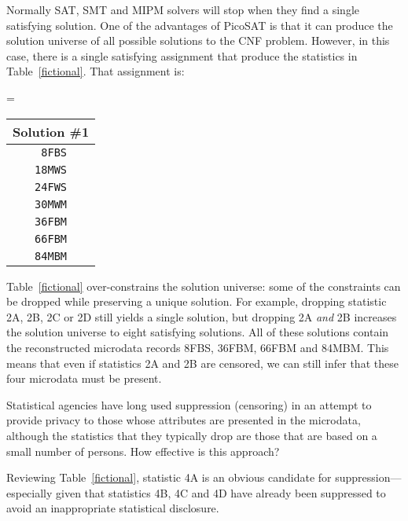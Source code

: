 \documentclass[runningheads]{llncs}
\begin{document}
Normally SAT, SMT and MIPM solvers will stop when they find a single
satisfying solution. One of the advantages of PicoSAT is that it can
produce the solution universe of all possible solutions to the CNF
problem. However, in this case, there is a single satisfying
assignment that produce the statistics in
Table~\ref{fictional}. That assignment is:

\begin{center}
\begin{minipage}{1.5in}
  
\end{minipage}
\begin{minipage}{.5in}
  =
\end{minipage}
\begin{minipage}{1.5in}
\begin{tabular}{c}
  Solution \#1\\
  \hline
\texttt{ 8FBS}\\
\texttt{18MWS}\\
\texttt{24FWS}\\
\texttt{30MWM}\\
\texttt{36FBM}\\
\texttt{66FBM}\\
\texttt{84MBM}\\
\end{tabular}
\end{minipage}
\end{center}  
Table~\ref{fictional} over-constrains the solution universe: some of the
constraints can be dropped while preserving a unique
solution. For example, dropping statistic 2A, 2B, 2C or 2D still yields a
single solution, but dropping 2A \emph{and} 2B increases the solution universe to
eight satisfying solutions. All of these solutions contain the
reconstructed microdata records 8FBS, 36FBM, 66FBM and 84MBM. This
means that even if statistics 2A and 2B are censored, we can still
infer that these four microdata must be present.

Statistical agencies have long used suppression (censoring) in an
attempt to provide privacy to those whose attributes are presented in
the microdata, although the statistics that they typically drop are
those that are based on a small number of persons. How effective is
this approach?

Reviewing Table~\ref{fictional}, statistic 4A is an obvious candidate
for suppression---especially given that statistics 4B, 4C and 4D have
already been suppressed to avoid an inappropriate statistical
disclosure.
\end{document}
